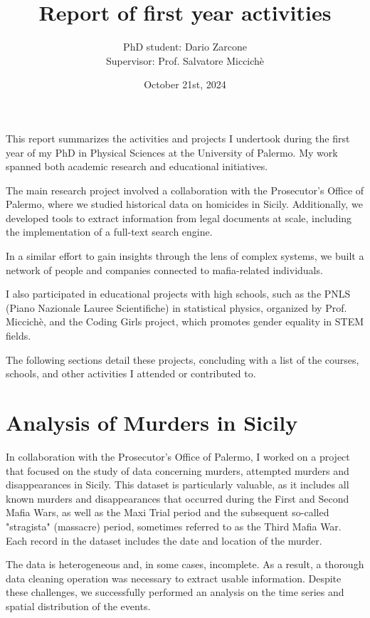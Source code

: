 \documentclass[a4paper, 10pt]{scrartcl}
\title{\LARGE{Report of first year activities}}
\author{\large{PhD student: Dario Zarcone}\\\large{Supervisor: Prof. Salvatore Miccichè}}
\date{\normalsize{October 21st, 2024}}
\begin{document}
\maketitle

This report summarizes the activities and projects I undertook during the first year of my PhD in Physical Sciences at the University of Palermo. My work spanned both academic research and educational initiatives.

The main research project involved a collaboration with the Prosecutor's Office of Palermo, where we studied historical data on homicides in Sicily. Additionally, we developed tools to extract information from legal documents at scale, including the implementation of a full-text search engine.

In a similar effort to gain insights through the lens of complex systems, we built a network of people and companies connected to mafia-related individuals.

I also participated in educational projects with high schools, such as the PNLS (Piano Nazionale Lauree Scientifiche) in statistical physics, organized by Prof. Miccichè, and the Coding Girls project, which promotes gender equality in STEM fields.

The following sections detail these projects, concluding with a list of the courses, schools, and other activities I attended or contributed to.

\section{Analysis of Murders in Sicily}

In collaboration with the Prosecutor's Office of Palermo, I worked on a project that focused on the study of data concerning murders, attempted murders and disappearances in Sicily. This dataset is particularly valuable, as it includes all known murders and disappearances that occurred during the First and Second Mafia Wars, as well as the Maxi Trial period and the subsequent so-called "stragista" (massacre) period, sometimes referred to as the Third Mafia War. Each record in the dataset includes the date and location of the murder.

The data is heterogeneous and, in some cases, incomplete. As a result, a thorough data cleaning operation was necessary to extract usable information. Despite these challenges, we successfully performed an analysis on the time series and spatial distribution of the events.
\end{document}
